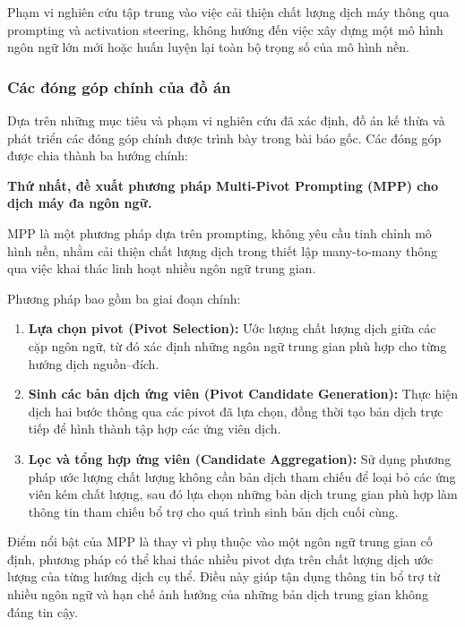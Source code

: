 Phạm vi nghiên cứu tập trung vào việc cải thiện chất lượng dịch máy thông qua prompting và activation steering, không hướng đến việc xây dựng một mô hình ngôn ngữ lớn mới hoặc huấn luyện lại toàn bộ trọng số của mô hình nền.

\subsubsection{Các đóng góp chính của đồ án}

Dựa trên những mục tiêu và phạm vi nghiên cứu đã xác định, đồ án kế thừa và phát triển các đóng góp chính được trình bày trong bài báo gốc. Các đóng góp được chia thành ba hướng chính:

\textbf{Thứ nhất, đề xuất phương pháp Multi-Pivot Prompting (MPP) cho dịch máy đa ngôn ngữ.}

MPP là một phương pháp dựa trên prompting, không yêu cầu tinh chỉnh mô hình nền, nhằm cải thiện chất lượng dịch trong thiết lập many-to-many thông qua việc khai thác linh hoạt nhiều ngôn ngữ trung gian.

Phương pháp bao gồm ba giai đoạn chính:

\begin{enumerate}
    \item \textbf{Lựa chọn pivot (Pivot Selection):}
    Ước lượng chất lượng dịch giữa các cặp ngôn ngữ, từ đó xác định những ngôn ngữ trung gian phù hợp cho từng hướng dịch nguồn--đích.

    \item \textbf{Sinh các bản dịch ứng viên (Pivot Candidate Generation):}
    Thực hiện dịch hai bước thông qua các pivot đã lựa chọn, đồng thời tạo bản dịch trực tiếp để hình thành tập hợp các ứng viên dịch.

    \item \textbf{Lọc và tổng hợp ứng viên (Candidate Aggregation):}
    Sử dụng phương pháp ước lượng chất lượng không cần bản dịch tham chiếu để loại bỏ các ứng viên kém chất lượng, sau đó lựa chọn những bản dịch trung gian phù hợp làm thông tin tham chiếu bổ trợ cho quá trình sinh bản dịch cuối cùng.
\end{enumerate}

Điểm nổi bật của MPP là thay vì phụ thuộc vào một ngôn ngữ trung gian cố định, phương pháp có thể khai thác nhiều pivot dựa trên chất lượng dịch ước lượng của từng hướng dịch cụ thể. Điều này giúp tận dụng thông tin bổ trợ từ nhiều ngôn ngữ và hạn chế ảnh hưởng của những bản dịch trung gian không đáng tin cậy.

